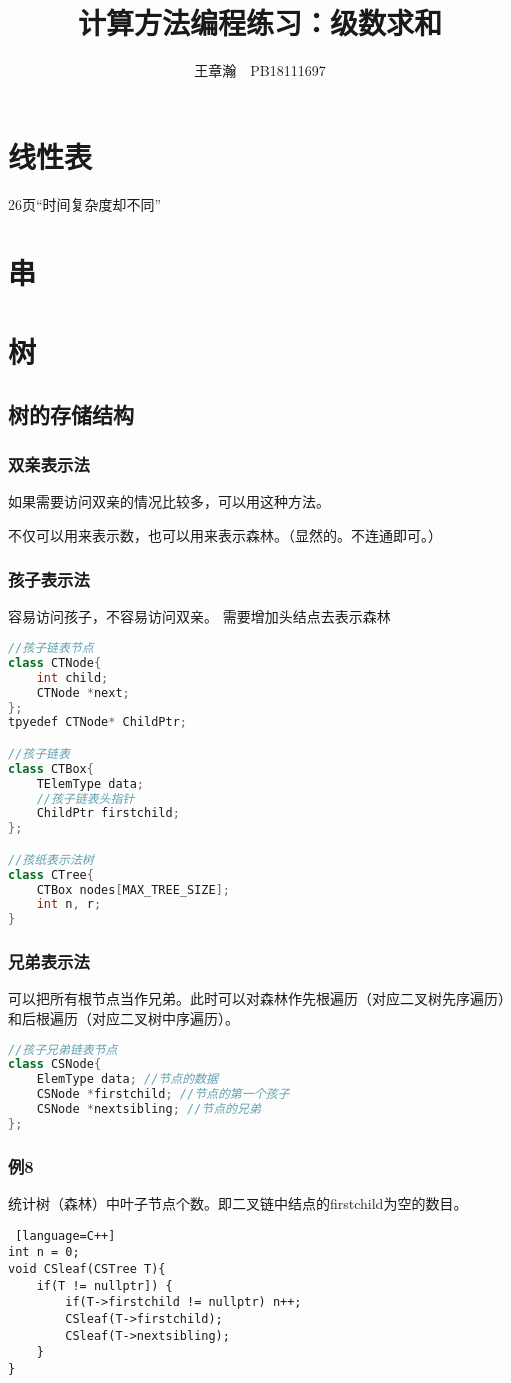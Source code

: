 \documentclass[UTF8]{article}
\title{计算方法编程练习：级数求和}
\author{王章瀚　PB18111697}
\begin{document}
\section{线性表}
26页“时间复杂度却不同”\\



\section{串}


	
	
	
	
\section{树}
\subsection{树的存储结构}
\subsubsection{双亲表示法}
如果需要访问双亲的情况比较多，可以用这种方法。\par
不仅可以用来表示数，也可以用来表示森林。（显然的。不连通即可。）
\subsubsection{孩子表示法}
容易访问孩子，不容易访问双亲。
需要增加头结点去表示森林
\begin{lstlisting}[language=C++]
//孩子链表节点
class CTNode{
	int child;
	CTNode *next;
};
tpyedef CTNode* ChildPtr;

//孩子链表
class CTBox{
	TElemType data;
	//孩子链表头指针
	ChildPtr firstchild;
};

//孩纸表示法树
class CTree{
	CTBox nodes[MAX_TREE_SIZE];
	int n, r;
}
\end{lstlisting}
\subsubsection{兄弟表示法}
可以把所有根节点当作兄弟。此时可以对森林作先根遍历（对应二叉树先序遍历）和后根遍历（对应二叉树中序遍历）。
\begin{lstlisting}[language=C++]
//孩子兄弟链表节点
class CSNode{
	ElemType data; //节点的数据
	CSNode *firstchild; //节点的第一个孩子
	CSNode *nextsibling; //节点的兄弟
};
\end{lstlisting}
\subsubsection{例8}
统计树（森林）中叶子节点个数。即二叉链中结点的firstchild为空的数目。
\begin{lstlisting} [language=C++]
int n = 0;
void CSleaf(CSTree T){
	if(T != nullptr]) {
		if(T->firstchild != nullptr) n++;
		CSleaf(T->firstchild);
		CSleaf(T->nextsibling);
	}
}
\end{lstlisting}
\end{document}
